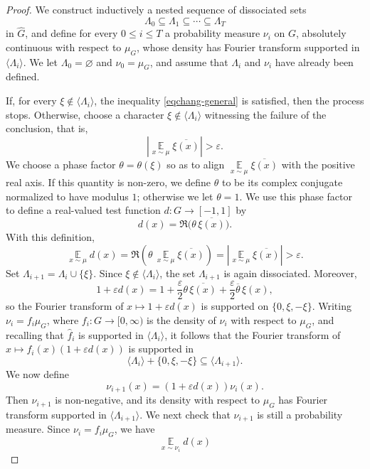 \documentclass[11pt,reqno]{amsart}
\theoremstyle{plain}
\theoremstyle{remark}
\begin{document}
\begin{proof}
We construct inductively a nested sequence of dissociated sets
$$
\Lambda_0\subseteq \Lambda_1\subseteq \cdots \subseteq \Lambda_T
$$
in $\widehat G$, and define for every $0\le i\le T$ a probability measure
$\nu_i$ on $G$, absolutely continuous with respect to $\mu_G$, whose density
has Fourier transform supported in $\langle \Lambda_i\rangle$. We let
$\Lambda_0=\varnothing$ and $\nu_0=\mu_G$, and assume that $\Lambda_i$ and
$\nu_i$ have already been defined.

If, for every $\xi\notin \langle\Lambda_i\rangle$, the inequality
\eqref{eqchang-general} is satisfied, then the process stops. Otherwise,
choose a character $\xi\notin\langle\Lambda_i\rangle$ witnessing the failure of
the conclusion, that is,
$$
\left|
\mathop{\mathbb E}\limits_{x\sim\mu}\overline{\xi(x)}
\right|
>
\varepsilon.
$$
We choose a phase factor $\theta=\theta(\xi)$ so as to align
$\mathop{\mathbb E}\limits_{x\sim\mu}\overline{\xi(x)}$ with the positive real
axis. If this quantity is non-zero, we define $\theta$ to be its complex
conjugate normalized to have modulus $1$; otherwise we let $\theta=1$. We use
this phase factor to define a real-valued test function $d:G\to[-1,1]$ by
$$
d(x)=\Re\bigl(\theta\,\overline{\xi(x)}\bigr).
$$
With this definition,
$$
\mathop{\mathbb E}\limits_{x\sim\mu}d(x)
=
\Re\left(
\theta\,
\mathop{\mathbb E}\limits_{x\sim\mu}\overline{\xi(x)}
\right)
=
\left|
\mathop{\mathbb E}\limits_{x\sim\mu}\overline{\xi(x)}
\right|
>
\varepsilon.
$$
Set $\Lambda_{i+1}=\Lambda_i\cup\{\xi\}$. Since
$\xi\notin\langle\Lambda_i\rangle$, the set $\Lambda_{i+1}$ is again
dissociated. Moreover,
$$
1+\varepsilon d(x)
=
1+\frac{\varepsilon}{2}\theta\,\overline{\xi(x)}
+\frac{\varepsilon}{2}\overline{\theta}\,\xi(x),
$$
so the Fourier transform of $x\mapsto 1+\varepsilon d(x)$ is supported on
$\{0,\xi,-\xi\}$. Writing $\nu_i=f_i\mu_G$, where
$f_i:G\to[0,\infty)$ is the density of $\nu_i$ with respect to $\mu_G$, and
recalling that $\widehat f_i$ is supported in $\langle\Lambda_i\rangle$, it
follows that the Fourier transform of $x\mapsto f_i(x)(1+\varepsilon d(x))$
is supported in
$$
\langle\Lambda_i\rangle+\{0,\xi,-\xi\}
\subseteq
\langle\Lambda_{i+1}\rangle.
$$
We now define
$$
\nu_{i+1}(x)=(1+\varepsilon d(x))\nu_i(x).
$$
Then $\nu_{i+1}$ is non-negative, and its density with respect to $\mu_G$ has
Fourier transform supported in $\langle\Lambda_{i+1}\rangle$. We next check that $\nu_{i+1}$ is still a probability measure. Since
$\nu_i=f_i\mu_G$, we have
$$
\mathop{\mathbb E}\limits_{x\sim\nu_i}d(x)
$$
\end{proof}
\end{document}

